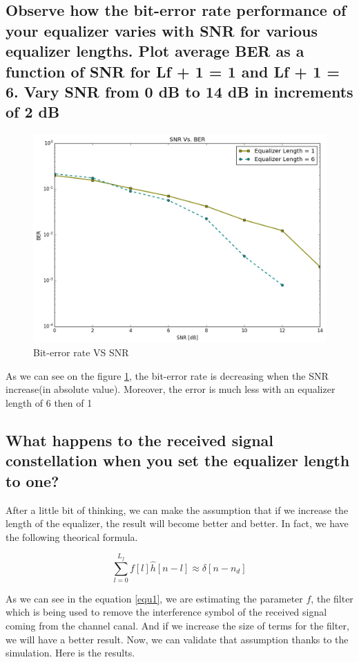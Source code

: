 \documentclass[frenchb, oneside, headings=normal]{scrartcl}
\begin{document}
\subsection{Observe how the bit-error rate performance
of your equalizer varies with SNR for various equalizer lengths. Plot average BER as a function of SNR for Lf + 1 = 1 and Lf + 1 = 6.
Vary SNR from 0 dB to 14 dB in increments of 2 dB}

\begin{figure}[ht!]
\centering
\includegraphics[scale=0.25]{img/SNR.png}
\caption{Bit-error rate VS SNR}
\label{BER}
\end{figure}


As we can see on the figure \ref{BER}, the bit-error rate is decreasing when the SNR increase(in absolute value).
Moreover, the error is much less with an equalizer length of 6 then  of 1


\subsection{What happens to the received signal constellation when you set the equalizer length to one?}

After a little bit of thinking, we can make the assumption that if we increase the length of the equalizer, the result will become better and better. In fact, we have the following theorical formula. 

\begin{equation}
\sum_{l=0}^{L_f}f[l]\hat{h}[n-l]\approx \delta [n-n_d]
\label{equ1}
\end{equation}

As we can see in the equation \ref{equ1}, we are estimating the parameter $f$, the filter which is being used to remove the interference symbol of the received signal coming from the channel canal. And if we increase the size of terms for the filter, we will have a better result. Now, we can validate that assumption thanks to the simulation. Here is the results.
\end{document}
